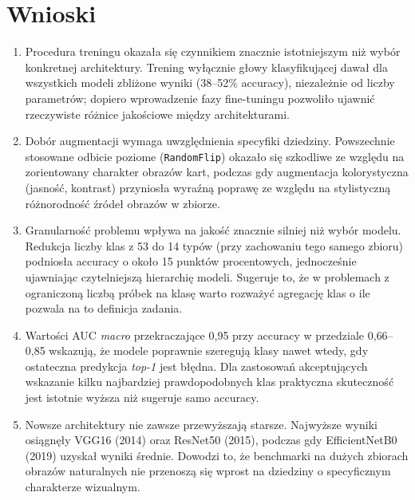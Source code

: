 \documentclass[12pt]{article}
\begin{document}
\FloatBarrier

\section{Wnioski}

\begin{enumerate}
  \item Procedura treningu okazała się czynnikiem znacznie istotniejszym niż wybór konkretnej architektury. Trening wyłącznie głowy klasyfikującej dawał dla wszystkich modeli zbliżone wyniki (38--52\% accuracy), niezależnie od liczby parametrów; dopiero wprowadzenie fazy fine-tuningu pozwoliło ujawnić rzeczywiste różnice jakościowe między architekturami.

  \item Dobór augmentacji wymaga uwzględnienia specyfiki dziedziny. Powszechnie stosowane odbicie poziome (\texttt{RandomFlip}) okazało się szkodliwe ze względu na zorientowany charakter obrazów kart, podczas gdy augmentacja kolorystyczna (jasność, kontrast) przyniosła wyraźną poprawę ze względu na stylistyczną różnorodność źródeł obrazów w zbiorze.

  \item Granularność problemu wpływa na jakość znacznie silniej niż wybór modelu. Redukcja liczby klas z 53 do 14 typów (przy zachowaniu tego samego zbioru) podniosła accuracy o około 15 punktów procentowych, jednocześnie ujawniając czytelniejszą hierarchię modeli. Sugeruje to, że w problemach z ograniczoną liczbą próbek na klasę warto rozważyć agregację klas o ile pozwala na to definicja zadania.

  \item Wartości AUC \textit{macro} przekraczające 0{,}95 przy accuracy w przedziale 0{,}66--0{,}85 wskazują, że modele poprawnie szeregują klasy nawet wtedy, gdy ostateczna predykcja \textit{top-1} jest błędna. Dla zastosowań akceptujących wskazanie kilku najbardziej prawdopodobnych klas praktyczna skuteczność jest istotnie wyższa niż sugeruje samo accuracy.

  \item Nowsze architektury nie zawsze przewyższają starsze. Najwyższe wyniki osiągnęły VGG16 (2014) oraz ResNet50 (2015), podczas gdy EfficientNetB0 (2019) uzyskał wyniki średnie. Dowodzi to, że benchmarki na dużych zbiorach obrazów naturalnych nie przenoszą się wprost na dziedziny o specyficznym charakterze wizualnym.


\end{enumerate}
\end{document}
